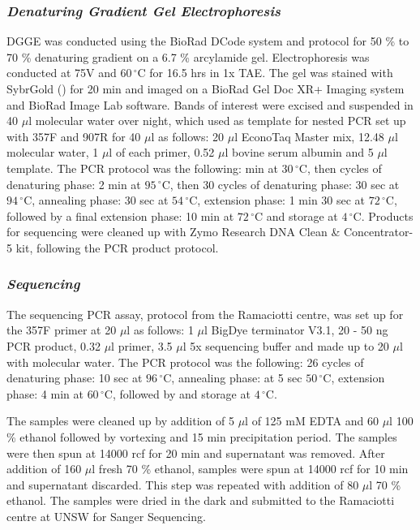 \documentclass{article}
\begin{document}
\subsubsection{\emph{Denaturing Gradient Gel Electrophoresis}}
DGGE was conducted using the BioRad DCode system and protocol for 50 \% to 70 \% denaturing gradient on a 6.7 \% arcylamide gel. Electrophoresis was conducted at 75V and $60\,^{\circ}\mathrm{C}$ for 16.5 hrs in 1x TAE. The gel was stained with SybrGold () for 20 min and imaged on a BioRad Gel Doc XR+ Imaging system and BioRad Image Lab software. Bands of interest were excised and suspended in 40 $\mu$l molecular water over night, which used as template for nested PCR set up with 357F and 907R for 40 $\mu$l as follows: 20 $\mu$l EconoTaq Master mix, 12.48 $\mu$l molecular water, 1 $\mu$l of each primer, 0.52 $\mu$l bovine serum albumin and 5 $\mu$l template. The PCR protocol was the following:  min at $30\,^{\circ}\mathrm{C}$, then  cycles of denaturing phase:    2 min at $95\,^{\circ}\mathrm{C}$, then 30 cycles of denaturing phase: 30 sec at $94\,^{\circ}\mathrm{C}$, annealing phase: 30 sec at  $54\,^{\circ}\mathrm{C}$, extension phase: 1 min 30 sec at $72\,^{\circ}\mathrm{C}$, followed by a final extension phase: 10 min at $72\,^{\circ}\mathrm{C}$ and storage at $4\,^{\circ}\mathrm{C}$. Products for sequencing were cleaned up with Zymo Research DNA Clean \& Concentrator-5 kit, following the PCR product protocol.

\subsubsection{\emph{Sequencing}}
The sequencing PCR assay, protocol from the Ramaciotti centre, was set up for the 357F primer at 20 $\mu$l as follows: 1 $\mu$l BigDye terminator V3.1, 20 - 50 ng PCR product, 0.32 $\mu$l primer, 3.5 $\mu$l 5x sequencing buffer and made up to 20 $\mu$l with molecular water. The PCR protocol was the following: 26 cycles of denaturing phase: 10 sec at $96\,^{\circ}\mathrm{C}$, annealing phase:  at 5 sec $50\,^{\circ}\mathrm{C}$, extension phase: 4 min at $60\,^{\circ}\mathrm{C}$, followed by and storage at $4\,^{\circ}\mathrm{C}$.

The samples were cleaned up by addition of 5 $\mu$l of 125 mM EDTA and 60 $\mu$l 100 \% ethanol followed by vortexing and 15 min precipitation period. The samples were then spun at 14000 rcf for 20 min and supernatant was removed. After addition of 160 $\mu$l fresh 70 \% ethanol, samples were spun at 14000 rcf for 10 min and supernatant discarded. This step was repeated with addition of 80 $\mu$l 70 \% ethanol. The samples were dried in the dark and submitted to the Ramaciotti centre at UNSW for Sanger Sequencing.
\end{document}
